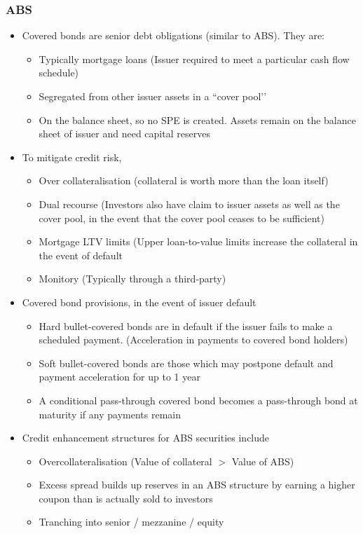 \documentclass[../notes_compiled.tex]{subfiles}
\begin{document}
\subsubsection*{ABS}
\begin{itemize}
\item Covered bonds are senior debt obligations (similar to ABS). They are:
\begin{itemize}
\item Typically mortgage loans (Issuer required to meet a particular cash flow schedule)
\item Segregated from other issuer assets in a ``cover pool’’
\item On the balance sheet, so no SPE is created. Assets remain on the balance sheet of issuer and need capital reserves
\end{itemize}
\item To mitigate credit risk,
\begin{itemize}
\item Over collateralisation (collateral is worth more than the loan itself)
\item Dual recourse (Investors also have claim to issuer assets as well as the cover pool, in the event that the cover pool ceases to be sufficient)
\item Mortgage LTV limits (Upper loan-to-value limits increase the collateral in the event of default
\item Monitory (Typically through a third-party)
\end{itemize}

\item Covered bond provisions, in the event of issuer default
\begin{itemize}
\item Hard bullet-covered bonds are in default if the issuer fails to make a scheduled payment. (Acceleration in payments to covered bond holders)
\item Soft bullet-covered bonds are those which may postpone default and payment acceleration for up to 1 year
\item A conditional pass-through covered bond becomes a pass-through bond at maturity if any payments remain
\end{itemize}

\item Credit enhancement structures for ABS securities include
\begin{itemize}
\item Overcollateralisation (Value of collateral $>$ Value of ABS)
\item Excess spread builds up reserves in an ABS structure by earning a higher coupon than is actually sold to investors
\item Tranching into senior / mezzanine / equity
\end{itemize}


\end{itemize}
\end{document}
